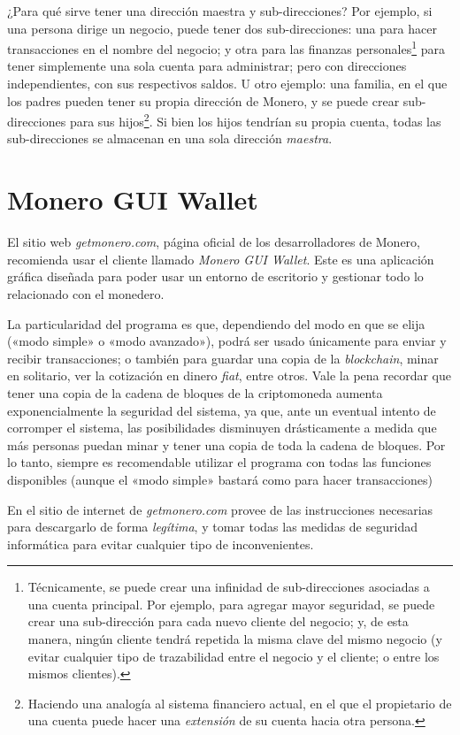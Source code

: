 \documentclass[12pt,a4paper,twoside]{book}
\begin{document}
¿Para qué sirve tener una dirección maestra y sub-direcciones? Por ejemplo, si una persona dirige un negocio, puede tener dos sub-direcciones: una para hacer transacciones en el nombre del negocio; y otra para las finanzas personales\footnote{Técnicamente, se puede crear una infinidad de sub-direcciones asociadas a una cuenta principal. Por ejemplo, para agregar mayor seguridad, se puede crear una sub-dirección para cada nuevo cliente del negocio; y, de esta manera, ningún cliente tendrá repetida la misma clave del mismo negocio (y evitar cualquier tipo de trazabilidad entre el negocio y el cliente; o entre los mismos clientes).} para tener simplemente una sola cuenta para administrar; pero con direcciones independientes, con sus respectivos saldos. U otro ejemplo: una familia, en el que los padres pueden tener su propia dirección de Monero, y se puede crear sub-direcciones para sus hijos\footnote{Haciendo una analogía al sistema financiero actual, en el que el propietario de una cuenta puede hacer una \textit{extensión} de su cuenta hacia otra persona.}. Si bien los hijos tendrían su propia cuenta, todas las sub-direcciones se almacenan en una sola dirección \textit{maestra}.

\section{Monero GUI Wallet}
El sitio web \textit{getmonero.com}, página oficial de los desarrolladores de Monero, recomienda usar el cliente llamado \textit{Monero GUI Wallet}. Este es una aplicación gráfica diseñada para poder usar un entorno de escritorio y gestionar todo lo relacionado con el monedero.

La particularidad del programa es que, dependiendo del modo en que se elija («modo simple» o «modo avanzado»), podrá ser usado únicamente para enviar y recibir transacciones; o también para guardar una copia de la \textit{blockchain}, minar en solitario, ver la cotización en dinero \textit{fiat}, entre otros. Vale la pena recordar que tener una copia de la cadena de bloques de la criptomoneda aumenta exponencialmente la seguridad del sistema, ya que, ante un eventual intento de corromper el sistema, las posibilidades disminuyen drásticamente a medida que más personas puedan minar y tener una copia de toda la cadena de bloques. Por lo tanto, siempre es recomendable utilizar el programa con todas las funciones disponibles (aunque el «modo simple» bastará como para hacer transacciones)

En el sitio de internet de \textit{getmonero.com} provee de las instrucciones necesarias para descargarlo de forma \textit{legítima}, y tomar todas las medidas de seguridad informática para evitar cualquier tipo de inconvenientes.
\end{document}
